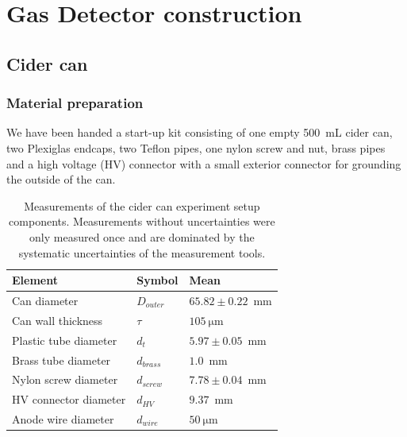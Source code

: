 \section{Gas Detector construction}
\label{sec:construction}

\subsection{Cider can}
\subsubsection{Material preparation}
We have been handed a start-up kit consisting of one empty \SI{500}{\milli\liter}
cider can, two Plexiglas endcaps, two Teflon pipes, one nylon screw and nut,
brass pipes and a high voltage (HV) connector with a small exterior connector for
grounding the outside of the can.

\begin{table}[H]
  \begin{tabularx}{\linewidth}{p{3.6cm}p{1cm}p{3cm}}
    \textbf{Element}           & \textbf{Symbol}              & \textbf{Mean} \\ \hline
    Can diameter         & $D_{outer}$   & $65.82 \pm 0.22$~mm     \\
    Can wall thickness   & $\tau$        & $\SI{105}{\micro\meter}$   \\
    Plastic tube diameter      & $d_{t}$       & $5.97 \pm 0.05$~mm       \\
    Brass tube diameter        & $d_{brass}$   & $1.0$~mm       \\
    Nylon screw diameter       & $d_{screw}$   & $7.78 \pm 0.04$~mm       \\
    HV connector diameter      & $d_{HV}$      & $9.37$~mm      \\
    Anode wire diameter        & $d_{wire}$    & $\SI{50}{\micro\meter}$    \\
    \hline
  \end{tabularx}
  \caption{Measurements of the cider can experiment setup components. Measurements without uncertainties were only measured once and are dominated by the systematic uncertainties of the measurement tools.}
  \label{Tab:cidercan_sizes}
\end{table}

